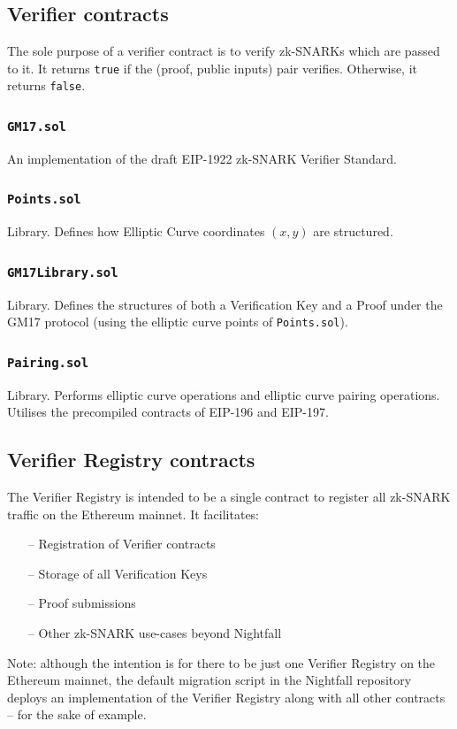 \documentclass{article}
\begin{document}
\subsection{Verifier contracts}
The sole purpose of a verifier contract is to verify zk-SNARKs which are passed to it. It returns \texttt{true} if the (proof, public inputs) pair verifies. Otherwise, it returns \texttt{false}.
\subsubsection{\texttt{GM17.sol}}
An implementation of the draft EIP-1922 zk-SNARK Verifier Standard.

\subsubsection{\texttt{Points.sol}}
Library. Defines how Elliptic Curve coordinates $(x, y)$ are structured.

\subsubsection{\texttt{GM17Library.sol}}
Library. Defines the structures of both a Verification Key and a Proof under the GM17 protocol (using the elliptic curve points of \texttt{Points.sol}).

\subsubsection{\texttt{Pairing.sol}}
Library. Performs elliptic curve operations and elliptic curve pairing operations. Utilises the precompiled contracts of EIP-196 and EIP-197.

\subsection{Verifier Registry contracts}
The Verifier Registry is intended to be a single contract to register all zk-SNARK traffic on the Ethereum mainnet. It facilitates:
\begin{itemize}
  \item[--] Registration of Verifier contracts
  \item[--] Storage of all Verification Keys
  \item[--] Proof submissions
  \item[--] Other zk-SNARK use-cases beyond Nightfall
\end{itemize}

Note: although the intention is for there to be just one Verifier Registry on the Ethereum mainnet, the default migration script in the Nightfall repository deploys an implementation of the Verifier Registry along with all other contracts -- for the sake of example.
\end{document}
